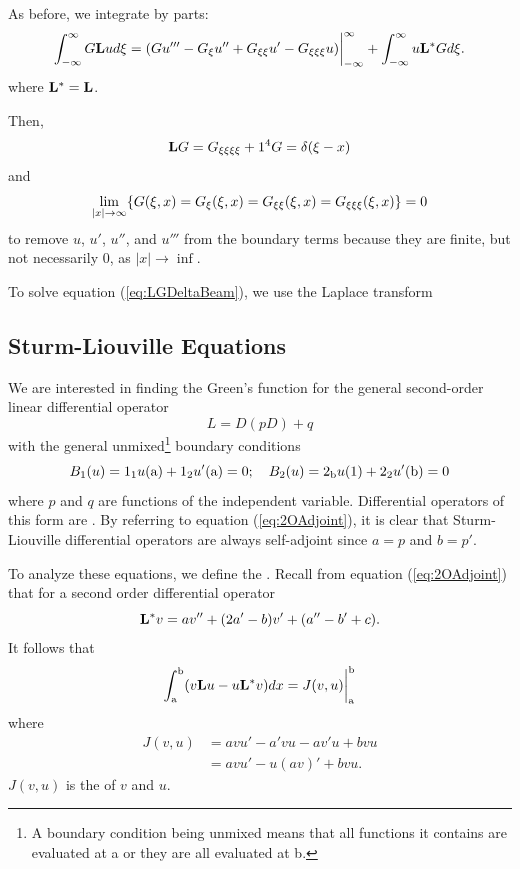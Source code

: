     As before, we integrate by parts:
    \begin{equation*}
        \int_{-\infty}^{\infty} G\mathrm{\bf{L}} u d\xi = (Gu'''-G_\xi u'' + G_{\xi\xi}u' - G_{\xi\xi\xi}u)\biggr\rvert_{-\infty}^{\infty} + \int_{-\infty}^{\infty} u\mathrm{\bf{L^*}} Gd\xi.
    \end{equation*}
    where \(\mathrm{\bf{L^*}} = \mathrm{\bf{L}}\). 

    Then, 
    \begin{equation}\label{eq:LGDeltaBeam}
        \mathrm{\bf{L}} G = G_{\xi\xi\xi\xi} + 1^4 G = \delta(\xi-x)
    \end{equation}
    and
    \begin{equation*}
        \lim_{|x|\to\infty}\{G(\xi,x)=G_\xi(\xi,x)=G_{\xi\xi}(\xi,x)=G_{\xi\xi\xi}(\xi,x)\}= 0
    \end{equation*}
    to remove \(u\), \(u'\), \(u''\), and \(u'''\) from the boundary terms because they are finite, but not necessarily 0, as \(|x|\to\inf\).

    To solve equation (\ref{eq:LGDeltaBeam}), we use the Laplace transform
\subsection{Sturm-Liouville Equations}
    We are interested in finding the Green's function for the general second-order linear differential operator
    \begin{equation}
        L = D(pD)+q
    \end{equation}
    with the general unmixed\footnote{A boundary condition being unmixed means that all functions it contains are evaluated at a or they are all evaluated at b.} boundary conditions
    \begin{equation*}
        B_1(u) =1_{1}u(\mathrm{a})+1_{2}u'(\mathrm{a}) = 0;\quad B_2(u) = 2_{\mathrm{b}}u(1)+2_{2}u'(\mathrm{b}) = 0
    \end{equation*}
    where \(p\) and \(q\) are functions of the independent variable. Differential operators of this form are . By referring to equation (\ref{eq:2OAdjoint}), it is clear that Sturm-Liouville differential operators are always self-adjoint since \(a=p\) and \(b=p'\). 

    To analyze these equations, we define the . Recall from equation (\ref{eq:2OAdjoint}) that for a second order differential operator
    \begin{equation*}
        \mathrm{\bf{L^*}} v = av''+(2a'-b)v'+(a''-b'+c).
    \end{equation*}
    It follows that 
    \begin{equation*}
        \int_\mathrm{a}^\mathrm{b} (v\mathrm{\bf{L}} u - u\mathrm{\bf{L^*}} v)dx = J(v,u)\biggr\rvert_{\mathrm{a}}^{\mathrm{b}}
    \end{equation*}
    where
    \begin{equation*}
        \begin{split}
            J(v,u) &= avu'-a'vu-av'u + bvu\\
            &=avu'- u(av)' +bvu.
        \end{split}
    \end{equation*}
    \(J(v,u)\) is the  of \(v\) and \(u\).

